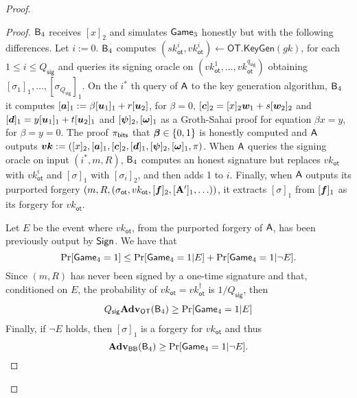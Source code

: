 \begin{proof}
\begin{proof}
$\mathsf{B}_4$ receives $[x]_2$ and simulates $\mathsf{Game}_3$ honestly but with the following differences. Let $i:=0$. $\mathsf{B}_4$ computes $(sk_\mathsf{ot}^i,vk_\mathsf{ot}^i)\gets\mathsf{OT}.\mathsf{KeyGen}(gk)$, for each $1\leq i\leq Q_\mathsf{sig}$ and queries its signing oracle on $(vk_{\mathsf{ot}}^1,\ldots,vk_\mathsf{ot}^{q_{\mathsf{sig}}})$ obtaining $[\sigma_1]_1,\ldots,[\sigma_{Q_\mathsf{sig}}]_1$. On the $i^*$ th query of $\mathsf{A}$ to the key generation algorithm, $\mathsf{B}_4$ it computes $[{\boldsymbol{a}}]_1:=\beta[{\boldsymbol{u}}_1]_1+r[{\boldsymbol{u}}_2]$, for $\beta=0$, $[{\boldsymbol{c}}]_2 = [x]_2{\boldsymbol{w}}_1+s[{\boldsymbol{w}}_2]_2$ and  $[{\boldsymbol{d}}]_1 = y[{\boldsymbol{u}}_1]_1 + t[{\boldsymbol{u}}_2]_1$ and $[{\boldsymbol{\psi}}]_2,[{\boldsymbol{\omega}}]_1$ as a Groth-Sahai proof for equation $\beta x = y$, for $\beta=y=0$. The proof $\pi_{\mathsf{bits}}$ that ${\boldsymbol{\beta}}\in\{0,1\}$ is honestly computed and $\mathsf{A}$ outputs ${\boldsymbol{vk}}:=([x]_2,[{\boldsymbol{a}}]_1,[{\boldsymbol{c}}]_2,[{\boldsymbol{d}}]_1,[{\boldsymbol{\psi}}]_2,[{\boldsymbol{\omega}}]_1,\pi)$. When $\mathsf{A}$ queries the signing oracle on input $(i^*,m,R)$, $\mathsf{B}_4$ computes an honest signature but replaces $vk_\mathsf{ot}$ with $vk_\mathsf{ot}^i$ and $[\sigma]_1$ with $[\sigma_i]_2$, and then adds 1 to $i$. Finally, when $\mathsf{A}$ outputs its purported forgery $(m,R,(\sigma_\mathsf{ot},vk_\mathsf{ot},[{\boldsymbol{f}}]_2,[\mathbf{{A}}']_1,\ldots))$, it extracts $[\sigma]_1$ from $[{\boldsymbol{f}}]_1$ as its forgery for $vk_\mathsf{ot}$.

Let $E$ be the event where $vk_\mathsf{ot}$, from the purported forgery of $\mathsf{A}$, has been previously output by $\mathsf{Sign}$. We have that
$$
\Pr[\mathsf{Game}_4=1]\leq \Pr[\mathsf{Game}_4=1|E]+\Pr[\mathsf{Game}_4=1|\neg E].
$$
Since  $(m,R)$ has never been signed by a one-time signature and that, conditioned on $E$, the probability of $vk_\mathsf{ot}=vk_\mathsf{ot}^\dag$ is $1/Q_\mathsf{sig}$, then
\begin{align*}
Q_{\mathsf{sig}}\mathbf{Adv}_\mathsf{OT}(\mathsf{B}_4)\geq  \Pr[\mathsf{Game}_4=1|E]
\end{align*}
Finally, if $\neg E$ holds, then $[\sigma]_1$ is a forgery for $vk_\mathsf{ot}$ and thus
$$
\mathbf{Adv}_{\mathsf{BB}}(\mathsf{B}_4)\geq \Pr[\mathsf{Game}_4=1|\neg E].$$
\end{proof}
\end{proof}


